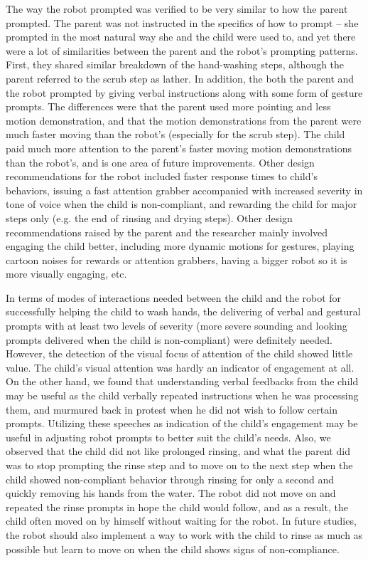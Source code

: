The way the robot prompted was verified to be very similar to how the parent prompted.  The parent was not instructed in the specifics of how to prompt -- she prompted in the most natural way she and the child were used to, and yet there were a lot of similarities between the parent and the robot's prompting patterns.  First, they shared similar breakdown of the hand-washing steps, although the parent referred to the scrub step as lather.  In addition, the both the parent and the robot prompted by giving verbal instructions along with some form of gesture prompts.  The differences were that the parent used more pointing and less motion demonstration, and that the motion demonstrations from the parent were much faster moving than the robot's (especially for the scrub step).  The child paid much more attention to the parent's faster moving motion demonstrations than the robot's, and is one area of future improvements.  Other design recommendations for the robot included faster response times to child's behaviors, issuing a fast attention grabber accompanied with increased severity in tone of voice when the child is non-compliant, and rewarding the child for major steps only (e.g. the end of rinsing and drying steps).  Other design recommendations raised by the parent and the researcher mainly involved engaging the child better, including more dynamic motions for gestures, playing cartoon noises for rewards or attention grabbers, having a bigger robot so it is more visually engaging, etc.

In terms of modes of interactions needed between the child and the robot for successfully helping the child to wash hands, the delivering of verbal and gestural prompts with at least two levels of severity (more severe sounding and looking prompts delivered when the child is non-compliant) were definitely needed.  However, the detection of the visual focus of attention of the child showed little value.  The child's visual attention was hardly an indicator of engagement at all.  On the other hand, we found that understanding verbal feedbacks from the child may be useful as the child verbally repeated instructions when he was processing them, and murmured back in protest when he did not wish to follow certain prompts.  Utilizing these speeches as indication of the child's engagement may be useful in adjusting robot prompts to better suit the child's needs.  Also, we observed that the child did not like prolonged rinsing, and what the parent did was to stop prompting the rinse step and to move on to the next step when the child showed non-compliant behavior through rinsing for only a second and quickly removing his hands from the water.  The robot did not move on and repeated the rinse prompts in hope the child would follow, and as a result, the child often moved on by himself without waiting for the robot.  In future studies, the robot should also implement a way to work with the child to rinse as much as possible but learn to move on when the child shows signs of non-compliance.


